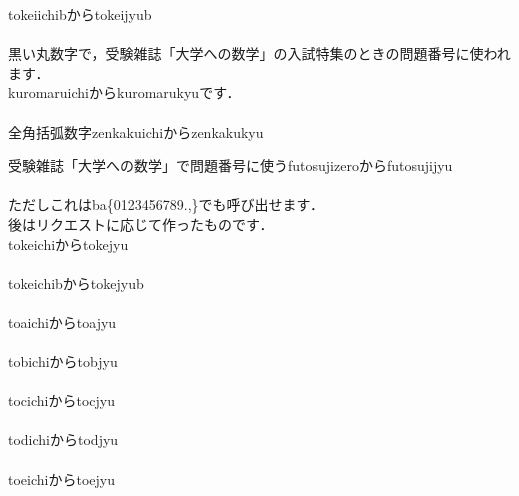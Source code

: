 \documentclass [10pt,fleqn,b5paper]{jsarticlek}
\begin{document}
\yy tokeiichibから\yy tokeijyub\\
\tokeiichib
\tokeinib
\tokeisanb
\tokeishib
\tokeigob
\tokeirokub
\tokeishichib
\tokeihachib
\tokeikyub
\tokeijyub\\
黒い丸数字で，受験雑誌「大学への数学」の入試特集のときの問題番号に使われます．\\
\yy kuromaruichiから\yy kuromarukyuです．\\
\kuromaruichi
\kuromaruni
\kuromarusan
\kuromarushi
\kuromarugo
\kuromaruroku
\kuromarushichi
\kuromaruhachi
\kuromarukyu\\
全角括弧数字\yy zenkakuichiから\yy zenkakukyu\\
\zenkakuichi
\zenkakuni
\zenkakusan
\zenkakushi
\zenkakugo
\zenkakuroku
\zenkakushichi
\zenkakuhachi
\zenkakukyu

受験雑誌「大学への数学」で問題番号に使う\yy futosujizeroから\yy futosujijyu\\
\futosujizero
\futosujiichi
\futosujini
\futosujisan
\futosujishi
\futosujigo
\futosujiroku
\futosujishichi
\futosujihachi
\futosujikyu  {}\\
ただしこれは\yy ba\{0123456789.,\}でも呼び出せます．
\\
後はリクエストに応じて作ったものです．\\
\yy tokeichiから\yy tokejyu\\
\tokeichi
\tokeni
\tokesan
\tokeshi
\tokego
\tokeroku
\tokeshichi
\tokehachi
\tokekyu
\tokejyu\\
\yy tokeichibから\yy tokejyub\\
\tokeichib
\tokenib
\tokesanb
\tokeshib
\tokegob
\tokerokub
\tokeshichib
\tokehachib
\tokekyub
\tokejyub\\
\yy toaichiから\yy toajyu\\
\toaichi
\toani
\toasan
\toashi
\toago
\toaroku
\toashichi
\toahachi
\toakyu
\toajyu\\
\yy tobichiから\yy tobjyu\\
\tobichi
\tobni
\tobsan
\tobshi
\tobgo
\tobroku
\tobshichi
\tobhachi
\tobkyu
\tobjyu\\
\yy tocichiから\yy tocjyu\\
\tocichi
\tocni
\tocsan
\tocshi
\tocgo
\tocroku
\tocshichi
\tochachi
\tockyu
\tocjyu\\
\yy todichiから\yy todjyu\\
\todichi
\todni
\todsan
\todshi
\todgo
\todroku
\todshichi
\todhachi
\todkyu
\todjyu\\
\yy toeichiから\yy toejyu\\
\toeichi
\end{document}
